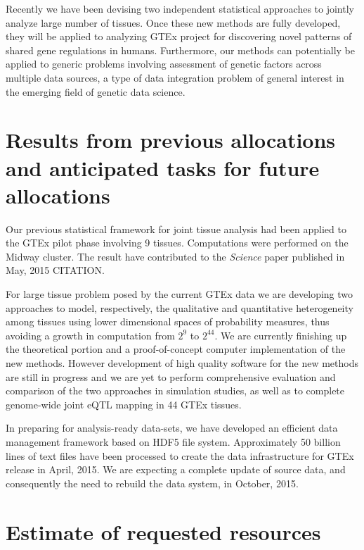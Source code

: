 \documentclass[10pt]{article}
\begin{document}
Recently we have been devising two independent statistical approaches to jointly analyze 
large number of tissues. 
Once these new methods are fully developed, they will be applied to analyzing GTEx project for discovering novel patterns of shared gene regulations in humans. 
Furthermore, our methods can potentially be applied to generic problems involving assessment of genetic factors across multiple data sources, a type of data integration problem of general interest in the emerging field of genetic data science.
 
\section*{Results from previous allocations and anticipated tasks for future
allocations}\label{results-from-previous-allocations}

Our previous statistical framework for joint tissue analysis had been applied to the GTEx pilot phase involving 9 tissues.
Computations were performed on the Midway cluster.
The result have contributed to the \textit{Science} paper published in May, 2015 CITATION. 

For large tissue problem posed by the current GTEx data we are developing two approaches to model, respectively, the qualitative and quantitative heterogeneity among tissues using lower dimensional spaces of probability measures, thus avoiding a growth in computation from $2^9$ to $2^{44}$. 
We are currently finishing up the theoretical portion and a proof-of-concept computer implementation of the new methods.
However development of high quality software for the new methods are still in progress and we are yet to perform comprehensive evaluation and comparison of the two approaches in simulation studies, as well as to complete genome-wide joint eQTL mapping in 44 GTEx tissues.

In preparing for analysis-ready data-sets, we have developed an efficient data management framework based on HDF5 file system. 
Approximately 50 billion lines of text files have been processed to create the data infrastructure for GTEx release in April, 2015. 
We are expecting a complete update of source data, and consequently the need to rebuild the data system, in October, 2015.

\section*{Estimate of requested
resources}\label{estimate-of-requested-resources}
\end{document}
